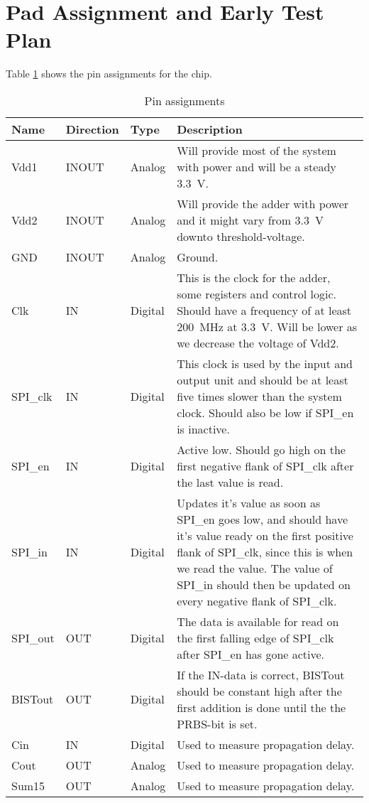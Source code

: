 \section{Pad Assignment and Early Test Plan}
Table \ref{tab:pins} shows the pin assignments for the chip.

\begin{table}[H]
  \caption{Pin assignments}
  \centering
  \begin{tabularx}{\linewidth}{|l|l|l|X|}
    \hline
    \textbf{Name} & \textbf{Direction} & \textbf{Type} & \textbf{Description} \\ \hline
    Vdd1 & INOUT & Analog & Will provide most of the system with power and will be a steady \SI{3.3}{\volt}. \\ \hline
    Vdd2 & INOUT & Analog & Will provide the adder with power and it might vary from \SI{3.3}{\volt} downto threshold-voltage. \\ \hline
    GND &  INOUT & Analog & Ground. \\ \hline
    Clk & IN & Digital & This is the clock for the adder, some registers and control logic. Should have a frequency of at least \SI{200}{\mega\hertz} at \SI{3.3}{\volt}. Will be lower as we decrease the voltage of Vdd2. \\ \hline
    SPI\_clk & IN & Digital & This clock is used by the input and output unit and should be at least five times slower than the system clock. Should also be low if SPI\_en is inactive. \\ \hline
    SPI\_en & IN & Digital & Active low. Should go high on the first negative flank of SPI\_clk after the last value is read. \\ \hline
    SPI\_in & IN & Digital & Updates it's value as soon as SPI\_en goes low, and should have it's value ready on the first positive flank of SPI\_clk, since this is when we read the value. The value of SPI\_in should then be updated on every negative flank of SPI\_clk. \\ \hline
    SPI\_out & OUT & Digital & The data is available for read on the first falling edge of SPI\_clk after SPI\_en has gone active. \\ \hline
    BISTout & OUT & Digital & If the IN-data is correct, BISTout should be constant high after the first addition is done until the the PRBS-bit is set.  \\ \hline
    Cin & IN & Digital & Used to measure propagation delay. \\ \hline
    Cout & OUT & Analog & Used to measure propagation delay. \\ \hline
    Sum15 & OUT & Analog & Used to measure propagation delay. \\ \hline
  \end{tabularx}
  \label{tab:pins}
\end{table}
